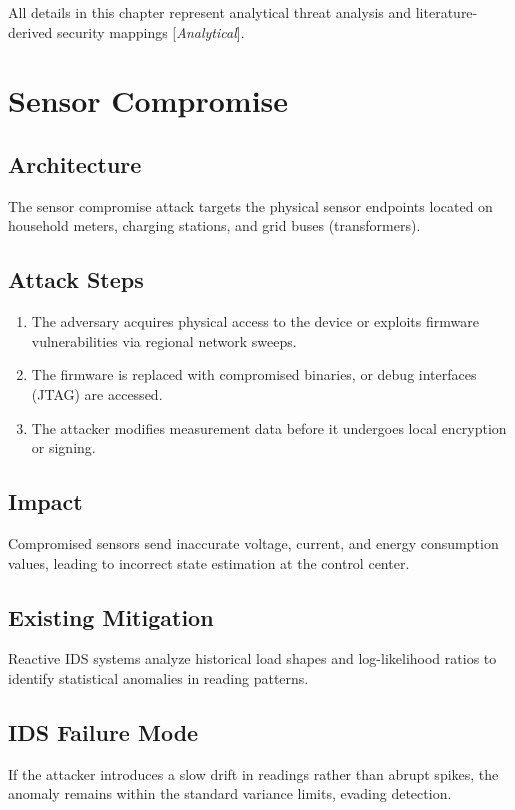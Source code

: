 \documentclass[12pt, oneside, a4paper]{report}
\theoremstyle{definition}
\theoremstyle{remark}
\newcommand{\analytical}{[\textit{Analytical}]}
\begin{document}
All details in this chapter represent analytical threat analysis and literature-derived security mappings \analytical.

\bigskip

\section{Sensor Compromise}
\label{sec:tm:sensor_compromise}

\subsection{Architecture}
The sensor compromise attack targets the physical sensor endpoints located on household meters, charging stations, and grid buses (transformers).

\subsection{Attack Steps}
\begin{enumerate}
  \item The adversary acquires physical access to the device or exploits firmware vulnerabilities via regional network sweeps.
  \item The firmware is replaced with compromised binaries, or debug interfaces (JTAG) are accessed.
  \item The attacker modifies measurement data before it undergoes local encryption or signing.
\end{enumerate}

\subsection{Impact}
Compromised sensors send inaccurate voltage, current, and energy consumption values, leading to incorrect state estimation at the control center.

\subsection{Existing Mitigation}
Reactive IDS systems analyze historical load shapes and log-likelihood ratios to identify statistical anomalies in reading patterns.

\subsection{IDS Failure Mode}
If the attacker introduces a slow drift in readings rather than abrupt spikes, the anomaly remains within the standard variance limits, evading detection.
\end{document}
